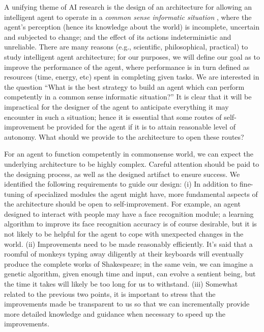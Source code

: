 \documentclass[]{llncs}
\begin{document}
A unifying theme of AI research is the design of an architecture for
allowing an intelligent agent to operate in a \emph{common sense informatic
situation} \cite{mccarthy1989:artificial_intelligence}, where the agent's
perception (hence its knowledge about the world) is incomplete, uncertain
and subjected to change; and the effect of its actions indeterministic and
unreliable.  There are many reasons (e.g., scientific, philosophical,
practical) to study intelligent agent architecture; for our purposes, we
will define our goal as to improve the performance of the agent, where
performance is in turn defined as resources (time, energy, etc) spent in
completing given tasks.  We are interested in the question {}``What is the
best strategy to build an agent which can perform competently in a common
sense informatic situation?''  It is clear that it will be impractical for
the designer of the agent to anticipate everything it may encounter in such
a situation; hence it is essential that some routes of self-improvement be
provided for the agent if it is to attain reasonable level of autonomy.
What should we provide to the architecture to open these routes?

For an agent to function competently in commonsense world, we can expect
the underlying architecture to be highly complex.  Careful attention should
be paid to the designing process, as well as the designed artifact to
ensure success.  We identified the following requirements to guide our
design: (i) In addition to fine-tuning of specialized modules the agent
might have, more fundamental aspects of the architecture should be open to
self-improvement.  For example, an agent designed to interact with people
may have a face recognition module; a learning algorithm to improve its
face recognition accuracy is of course desirable, but it is not likely to
be helpful for the agent to cope with unexpected changes in the world.
(ii) Improvements need to be made reasonably efficiently.  It's said that a
roomful of monkeys typing away diligently at their keyboards will
eventually produce the complete works of Shakespeare; in the same vein, we
can imagine a genetic algorithm, given enough time and input, can evolve a
sentient being, but the time it takes will likely be too long for us to
withstand.  (iii) Somewhat related to the previous two points, it is
important to stress that the improvements made be transparent to us so that
we can incrementally provide more detailed knowledge and guidance when
necessary to speed up the improvements.

  
\end{document}
